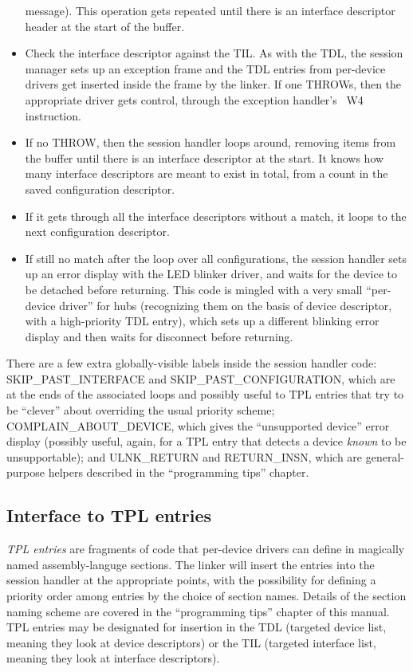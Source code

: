 \begin{itemize}
    message).  This operation gets repeated until there is an interface
    descriptor header at the start of the buffer.
  \item Check the interface descriptor against the TIL.  As with the TDL,
    the session manager sets up an exception frame and the TDL entries from
    per-device drivers get inserted inside the frame by the linker.  If one
    THROWs, then the appropriate driver gets control, through the exception
    handler's ~W4 instruction.
  \item If no THROW, then the session handler loops around, removing items
    from the buffer until there is an interface descriptor at the start.  It
    knows how many interface descriptors are meant to exist in total, from a
    count in the saved configuration descriptor.
  \item If it gets through all the interface descriptors without a match, it
    loops to the next configuration descriptor.
  \item If still no match after the loop over all configurations, the
    session handler sets up an error display with the LED blinker driver,
    and waits for the device to be detached before returning.  This code is
    mingled with a very small ``per-device driver'' for hubs (recognizing
    them on the basis of device descriptor, with a high-priority TDL entry),
    which sets up a different blinking error display and then waits for
    disconnect before returning.
\end{itemize}

There are a few extra globally-visible labels inside the session handler code:
SKIP\_PAST\_INTERFACE
and SKIP\_PAST\_CONFIGURATION, which are at the ends of the associated loops
and possibly useful to TPL entries that try to be ``clever'' about
overriding the usual priority scheme; COMPLAIN\_ABOUT\_DEVICE, which gives
the ``unsupported device'' error display (possibly useful, again, for a TPL
entry that detects a device \emph{known} to be unsupportable); and
ULNK\_RETURN and RETURN\_INSN, which are general-purpose helpers
described in the ``programming tips'' chapter.

\subsection{Interface to TPL entries}

\emph{TPL entries} are fragments of code that per-device drivers can define
in magically named assembly-languge sections.  The linker will insert the
entries into the session handler at the appropriate points, with the
possibility for defining a priority order among entries by the choice of
section names.  Details of the section naming scheme are covered in the
``programming tips'' chapter of this manual.  TPL entries may be designated
for insertion in the TDL (targeted device list, meaning they look at device
descriptors) or the TIL (targeted interface list, meaning they look at
interface descriptors).

